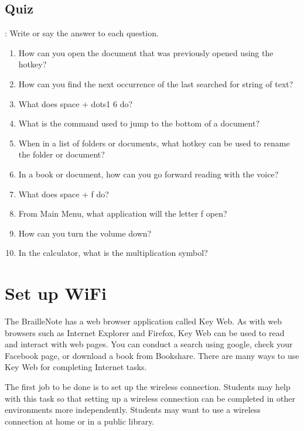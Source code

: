 \documentclass[10pt,letterpaper,twoside]{report}
\begin{document}
{\subsection{Quiz}:
Write or say the answer to each question.
\begin{enumerate}
	\item How can you open the document that was previously opened using the hotkey?
	\item How can you find the next occurrence of the last searched for string of text?
	\item What does space + dots1 6 do?
	\item What is the command used to jump to the bottom of a document?
	\item When in a list of folders or documents, what hotkey can be used to rename the folder or document?
	\item In a book or document, how can you go forward reading with the voice?
	\item What does space + f do?
	\item From Main Menu, what application will the letter f open?
	\item How can you turn the volume down?
	\item In the calculator, what is the multiplication symbol?
\end{enumerate}

\clearpage
\section{Set up WiFi}
The BrailleNote has a web browser application called Key Web. As with web browsers such as Internet Explorer and Firefox, Key Web can be used to read and interact with web pages. You can conduct a search using google, check your Facebook page, or download a book from Bookshare. There are many ways to use Key Web for completing Internet tasks.

The first job to be done is to set up the wireless connection. Students may help with this task so that setting up a wireless connection can be completed in other environments more independently. Students may want to use a wireless connection at home or in a public library.

}
\end{document}

